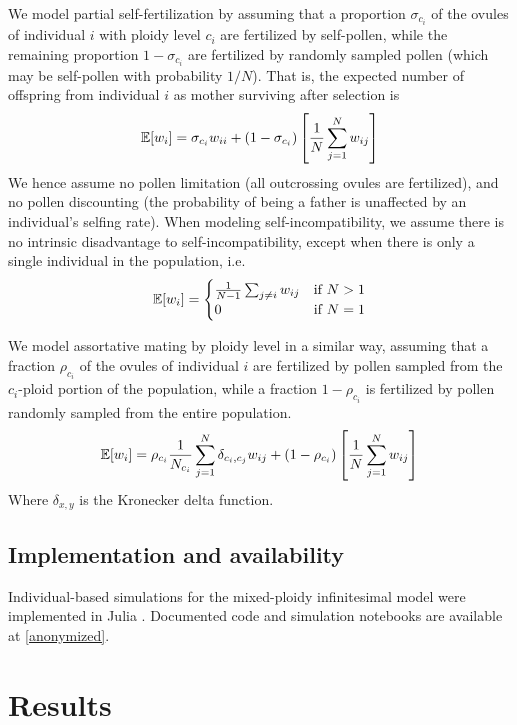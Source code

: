 \documentclass[12pt,a4paper]{article}
\begin{document}
We model partial self-fertilization by assuming that a proportion
$\sigma_{c_i}$ of the ovules of individual $i$ with ploidy level $c_i$ are
fertilized by self-pollen, while the remaining proportion $1-\sigma_{c_i}$ are
fertilized by randomly sampled pollen (which may be self-pollen with
probability $1/N$). 
That is, the expected number of offspring from individual $i$ as mother
surviving after selection is
\begin{equation}
\mathbb{E}[w_i] = \sigma_{c_i} w_{ii} +
  (1-\sigma_{c_i})\left[\frac{1}{N}\sum_{j=1}^N w_{ij}\right]
\end{equation}
We hence assume no pollen limitation (all outcrossing ovules are fertilized),
and no pollen discounting (the probability of being a father is unaffected by
an individual's selfing rate).
When modeling self-incompatibility, we assume there is no intrinsic
disadvantage to self-incompatibility, except when there is only a single
individual in the population, i.e.
\begin{equation}
\mathbb{E}[w_i] = \begin{cases}
    \frac{1}{N-1}\sum_{j \ne i }w_{ij} & \text{if } N > 1\\ 
    0 & \text{if } N=1 \end{cases}
\end{equation}

We model assortative mating by ploidy level in a similar way, assuming that a
fraction $\rho_{c_i}$ of the ovules of individual $i$ are fertilized by pollen
sampled from the $c_i$-ploid portion of the population, while a fraction
$1-\rho_{c_i}$ is fertilized by pollen randomly sampled from the entire
population.
\begin{equation}
\mathbb{E}[w_i] = \rho_{c_i} \frac{1}{N_{c_{i}}} \sum_{j=1}^N \delta_{c_i,c_j}w_{ij}
 + (1-\rho_{c_i})
\left[\frac{1}{N}\sum_{j=1}^N w_{ij}\right]
\end{equation}
Where $\delta_{x,y}$ is the Kronecker delta function.

\subsection*{Implementation and availability}

Individual-based simulations for the mixed-ploidy infinitesimal model were
implemented in Julia \citep{julia}.
Documented code and simulation notebooks are available at \url{[anonymized]}.

\section*{Results}
\end{document}

